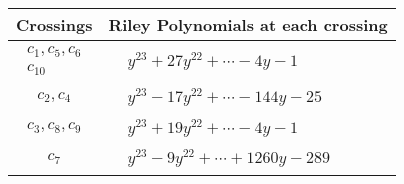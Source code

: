 \documentclass[1p]{elsarticle_modified}
\theoremstyle{definition}
\begin{document}
\begin{tabular}{m{50pt}|m{274pt}}
Crossings & \hspace{64pt}Riley Polynomials at each crossing \\
\hline $$\begin{aligned}c_{1},c_{5},c_{6}\\c_{10}\end{aligned}$$&$\begin{aligned}
&y^{23}+27 y^{22}+\cdots-4 y-1
\end{aligned}$\\
\hline $$\begin{aligned}c_{2},c_{4}\end{aligned}$$&$\begin{aligned}
&y^{23}-17 y^{22}+\cdots-144 y-25
\end{aligned}$\\
\hline $$\begin{aligned}c_{3},c_{8},c_{9}\end{aligned}$$&$\begin{aligned}
&y^{23}+19 y^{22}+\cdots-4 y-1
\end{aligned}$\\
\hline $$\begin{aligned}c_{7}\end{aligned}$$&$\begin{aligned}
&y^{23}-9 y^{22}+\cdots+1260 y-289
\end{aligned}$\\
\hline
\end{tabular}
\vskip 2pc
\end{document}
